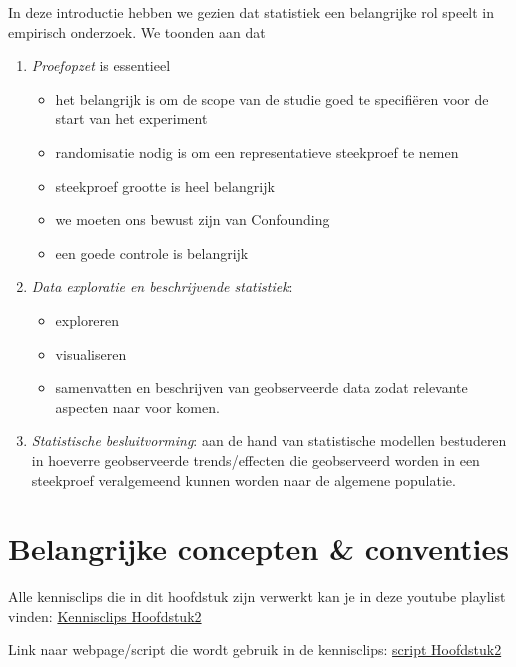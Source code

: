 \documentclass[
  12pt,dutch,coursenotes]{book}
\providecommand{\tightlist}{%
  \setlength{\itemsep}{0pt}\setlength{\parskip}{0pt}}
\theoremstyle{definition}
\theoremstyle{definition}
\theoremstyle{definition}
\theoremstyle{definition}
\theoremstyle{remark}
\begin{document}
In deze introductie hebben we gezien dat statistiek een belangrijke rol speelt in empirisch onderzoek. We toonden aan dat

\begin{enumerate}
\def\labelenumi{\arabic{enumi}.}
\item
  \emph{Proefopzet} is essentieel

  \begin{itemize}
  \item
    het belangrijk is om de scope van de studie goed te specifiëren voor de start van het experiment
  \item
    randomisatie nodig is om een representatieve steekproef te nemen
  \item
    steekproef grootte is heel belangrijk
  \item
    we moeten ons bewust zijn van Confounding
  \item
    een goede controle is belangrijk
  \end{itemize}
\item
  \emph{Data exploratie en beschrijvende statistiek}:

  \begin{itemize}
  \tightlist
  \item
    exploreren
  \item
    visualiseren
  \item
    samenvatten en beschrijven van geobserveerde data zodat relevante aspecten naar voor komen.
  \end{itemize}
\item
  \emph{Statistische besluitvorming}: aan de hand van statistische modellen bestuderen in hoeverre geobserveerde trends/effecten die geobserveerd worden in een steekproef veralgemeend kunnen worden naar de algemene populatie.
\end{enumerate}

\hypertarget{belangrijke-concepten-conventies}{%
\chapter{Belangrijke concepten \& conventies}\label{belangrijke-concepten-conventies}}

Alle kennisclips die in dit hoofdstuk zijn verwerkt kan je in deze youtube playlist vinden: \href{https://www.youtube.com/playlist?list=PLZH1hP8_LbJJ7apU5sAbRlUsve2nWz5ev}{Kennisclips Hoofdstuk2}

Link naar webpage/script die wordt gebruik in de kennisclips: \href{https://statomics.github.io/sbc21/rmd/02-concepts.html}{script Hoofdstuk2}
\end{document}
